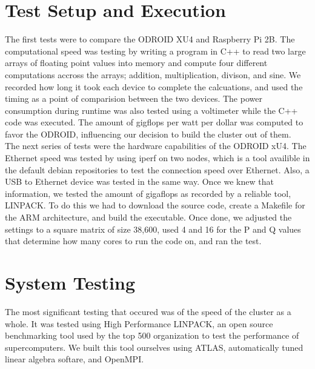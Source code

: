 \section{Test Setup and Execution}

The first tests were to compare the ODROID XU4 and Raspberry Pi 2B. The computational speed was testing by writing a program in C++ to read two large arrays of floating point values into memory and compute four different computations accross the arrays; addition, multiplication, divison, and sine. We recorded how long it took each device to complete the calcuations, and used the timing as a point of comparision between the two devices. The power consumption during runtime was also tested using a voltimeter while the C++ code was executed. The amount of gigflops per watt per dollar was computed to favor the ODROID, influencing our decision to build the cluster out of them. \\

The next series of tests were the hardware capabilities of the ODROID xU4. The Ethernet speed was tested by using iperf on two nodes, which is a tool availible in the default debian repositories to test the connection speed over Ethernet. Also, a USB to Ethernet device was tested in the same way. Once we knew that information, we tested the amount of gigaflops as recorded by a reliable tool, LINPACK. To do this we had to download the source code, create a Makefile for the ARM architecture, and build the executable. Once done, we adjusted the settings to a square matrix of size 38,600, used 4 and 16 for the P and Q values that determine how many cores to run the code on, and ran the test.

\section{System Testing}

The most significant testing that occured was of the speed of the cluster as a whole. It was tested using High Performance LINPACK, an open source benchmarking tool used by the top 500 organization to test the performance of supercomputers. We built this tool ourselves using ATLAS, automatically tuned linear algebra softare, and OpenMPI. 

